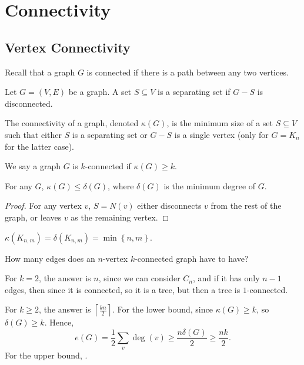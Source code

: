 \chapter{Connectivity}
\section{Vertex Connectivity}
Recall that a graph \(G\) is connected if there is a path between any two vertices. 

\begin{definition}
    Let \(G = (V, E)\) be a graph. A set \(S \subseteq V\) is a separating set if \(G - S\) is disconnected.   
\end{definition}

\begin{definition}
    The connectivity of a graph, denoted \(\kappa (G)\), is the minimum size of a set \(S \subseteq V\) such that either \(S\) is a separating set or \(G - S\) is a single vertex (only for \(G = K_n\) for the latter case).    
\end{definition}

\begin{definition}
    We say a graph \(G\) is \(k\)-connected if \(\kappa (G) \ge k\).   
\end{definition}

\begin{observation}
    For any \(G\), \(\kappa (G) \le \delta (G)\), where \(\delta (G)\) is the minimum degree of \(G\).     
\end{observation}
\begin{proof}
    For any vertex \(v\), \(S = N(v)\) either disconnects \(v\) from the rest of the graph, or leaves \(v\) as the remaining vertex.    
\end{proof}

\begin{eg}
    \(\kappa (K_{n, m}) = \delta (K_{n, m}) = \min \left\{ n, m \right\} \). 
\end{eg}

\begin{question}
    How many edges does an \(n\)-vertex \(k\)-connected graph have to have?  
\end{question}
\begin{answer}
    For \(k = 2\), the answer is \(n\), since we can consider \(C_n\), and if it has only \(n - 1\) edges, then since it is connected, so it is a tree, but then a tree is \(1\)-connected. 

    For \(k \ge 2\), the answer is \(\left\lceil \frac{kn}{2} \right\rceil \). For the lower bound, since \(\kappa (G) \ge k\), so \(\delta (G) \ge k\). Hence, 
    \[
        e(G) = \frac{1}{2} \sum_{v} \deg(v) \ge \frac{n \delta (G)}{2} \ge \frac{nk}{2}.
    \]
    For the upper bound, .         
\end{answer}

